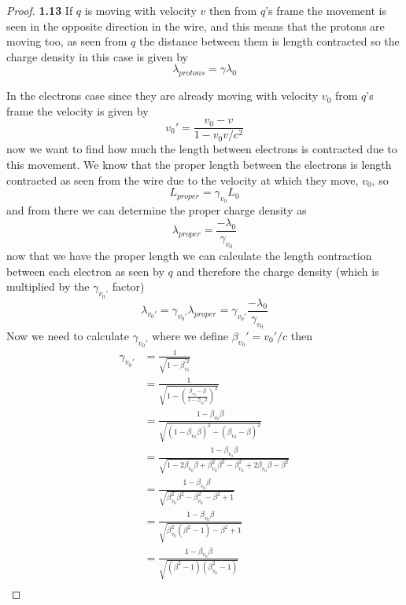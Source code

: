 \documentclass[11pt]{article}
\theoremstyle{definition}
\begin{document}
\cleardoublepage
	\begin{proof}{\textbf{1.13}}
        If $q$ is moving with velocity $v$ then from $q$'s frame the movement
        is seen in the opposite direction in the wire, and this means that the
        protons are moving too, as seen from $q$ the distance between them is
        length contracted so the charge density in this case is given by
        $$\lambda_{protons} = \gamma \lambda_0$$

        In the electrons case since they are already moving with velocity $v_0$
        from $q$'s frame the velocity is given by
        $$v_0'= \frac{v_0 - v}{1 - v_0v/c^2}$$
        now we want to find how much the length between electrons is
        contracted due to this movement. We know that the proper length between
        the electrons is length contracted as seen from the wire due to the
        velocity at which they move, $v_0$, so
        $$L_{proper} = \gamma_{v_0} L_{0}$$
        and from there we can determine the proper charge density as
        $$\lambda_{proper} = \frac{-\lambda_0}{\gamma_{v_0}}$$
        now that we have the proper length we can calculate the length
        contraction between each electron as seen by $q$ and therefore the
        charge density (which is multiplied by the $\gamma_{v_0'}$ factor) 
        $$\lambda_{v_0'} = \gamma_{v_0'}\lambda_{proper} = 
        \gamma_{v_0'}\frac{-\lambda_0}{\gamma_{v_0}}$$
        Now we need to calculate $\gamma_{v_0'}$ where we define
        $\beta_{v_0}' = v_0'/c$ then
        \begin{align*}
            \gamma_{v_0'} &= \frac{1}{\sqrt{1 - \beta_{v_0}^{'2}}}\\
                &= \frac{1}{\sqrt{1 - (\frac{\beta_{v_0} - \beta}{1-\beta_{v_0}\beta})^2}}\\
                &= \frac{1-\beta_{v_0}\beta}{\sqrt{(1-\beta_{v_0}\beta)^2 - (\beta_{v_0} - \beta)^2}}\\
                &= \frac{1-\beta_{v_0}\beta}{\sqrt{
                    1 - 2\beta_{v_0}\beta + \beta_{v_0}^2\beta^2 - \beta_{v_0}^2 + 2\beta_{v_0}\beta - \beta^2 
                }}\\
                &= \frac{1-\beta_{v_0}\beta}{\sqrt{\beta_{v_0}^2\beta^2 - \beta_{v_0}^2 - \beta^2 + 1}}\\
                &= \frac{1-\beta_{v_0}\beta}{\sqrt{\beta_{v_0}^2(\beta^2 - 1) -\beta^2 + 1}}\\
                &= \frac{1-\beta_{v_0}\beta}{\sqrt{(\beta^2 - 1)(\beta_{v_0}^2 -1)}}\\

\end{align*}
\end{proof}
\end{document}
